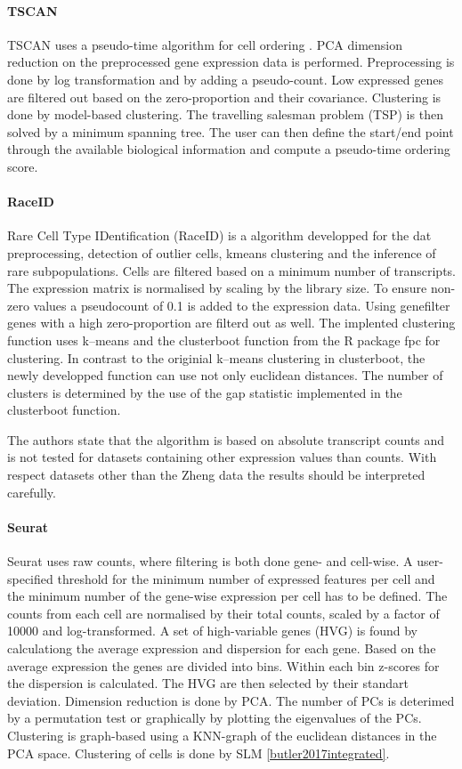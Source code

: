 \documentclass[12pt, a4paper]{article}\usepackage[]{graphicx}\usepackage[]{color}
\begin{document}
\paragraph{TSCAN}
TSCAN uses a pseudo-time algorithm for cell ordering \citep{ji2015tscan}. PCA dimension reduction on the preprocessed gene expression data is performed. Preprocessing is done by log transformation and by adding a pseudo-count. Low expressed genes are filtered out based on the zero-proportion and their covariance. Clustering is done by model-based clustering. 
The travelling salesman problem (TSP) is then solved by a minimum spanning tree. The user can then define the start/end point through the available biological information and compute a pseudo-time ordering score. 
\paragraph{RaceID}
Rare Cell Type IDentification (RaceID) is a algorithm developped for the dat preprocessing, detection of outlier cells, kmeans clustering and the inference of rare subpopulations. Cells are filtered based on a minimum number of transcripts. The expression matrix is normalised by scaling by the library size. To ensure non-zero values a pseudocount of 0.1 is added to the expression data.
Using genefilter genes with a high zero-proportion are filterd out as well.
The implented clustering function uses k--means and the clusterboot function from the R package fpc for clustering. In contrast to the originial k--means clustering in clusterboot, the newly developped function can use not only euclidean distances. 
The number of clusters is determined by the use of the gap statistic implemented in the clusterboot function.

The authors state that the algorithm is based on absolute transcript counts and is not tested for datasets containing other expression values than counts. With respect datasets other than the Zheng data the results should be interpreted carefully.

\paragraph{Seurat}
Seurat uses raw counts, where filtering is both done gene- and cell-wise. A user-specified threshold for the minimum number of expressed features per cell and the minimum number of the  gene-wise expression per cell has to be defined. The counts from each cell are normalised by their total counts, scaled by a factor of 10000 and log-transformed. A set of high-variable genes (HVG) is found by calculationg the average expression and dispersion for each gene. Based on the average expression the genes are divided into bins. Within each bin z-scores for the dispersion is calculated. The HVG are then selected by their standart deviation.
Dimension reduction is done by PCA. The number of PCs is deterimed by a permutation test or graphically by plotting the eigenvalues of the PCs. Clustering is graph-based using a KNN-graph of the euclidean distances in the PCA space. Clustering of cells is done by SLM \ref{butler2017integrated}.
\end{document}
